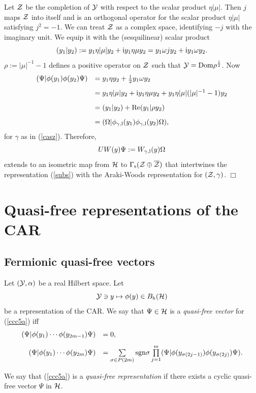 \documentclass{svmult}
\newcommand{\beq}{\begin{equation}}
\newcommand{\eeq}{\end{equation}}
\def\Re{{\rm Re}}
\def\bar{\overline}
\def\l{{\rm l}}
\def\s{{\rm s}}
\def\h{{\rm h}}
\def\cZ{{\cal Z}}
\def\cY{{\cal Y}}
\def\i{{\rm i}}
\def\Dom{{\rm Dom}}
\def\sgn{{\rm sgn}}
\def\qed{$\Box$\medskip}
\def\cH{{\cal H}}
\def\l{{\rm l}}
\def\sgn{{\rm sgn}}
\def\cH{{\cal H}}
\def\s{{\rm s}}
\begin{document}
Let $\cZ$ be the completion of $\cY$ with respect to the scalar product $\eta|\mu|$.
Then $j$ maps $\cZ$ into itself and is an orthogonal operator for
the scalar product $\eta|\mu|$ satisfying $j^2=-1$.
  We can treat  $\cZ$ as a complex space, identifying $-j$ with the
imaginary unit. We equip it with the (sesquilinear) scalar product
\[(y_1|y_2):=y_1\eta|\mu|y_2+\i y_1\eta\mu y_2
=y_1\omega jy_2+\i y_1\omega y_2.\] 
$\rho:=|\mu|^{-1}-1$ defines a positive operator on $\cZ$ such that
$\cY=\Dom\rho^{\frac12}$. 
Now
\[\begin{array}{rl}
(\Psi|\phi(y_1)\phi(y_2)\Psi)&=
y_1\eta y_2+\frac\i2 y_1\omega y_2\\[3mm]
&=
y_1\eta|\mu|y_2+\i y_1\eta\mu y_2
+y_1\eta|\mu|(|\mu|^{-1}-1)y_2
\\[3mm]
&=(y_1|y_2)+\Re(y_1|\rho y_2)\\[3mm]
&=(\Omega|\phi_{\gamma,\l}(y_1)\phi_{\gamma,\l}(y_2)\Omega),
\end{array}\]
for $\gamma$ as in (\ref{casz}).
Therefore,
\[UW(y)\Psi:=W_{\gamma,\l}(y)\Omega\]
extends to an isometric map from $\cH$ to $\Gamma_\s(\cZ\oplus\bar\cZ)$ that
intertwines 
 the representation (\ref{subs}) with the Araki-Woods representation for
 $(\cZ,\gamma)$. 
\qed




\section{Quasi-free representations of the CAR}



\subsection{Fermionic quasi-free vectors}

Let $(\cY,\alpha)$ be a real Hilbert space. Let
\beq \cY\ni y\mapsto \phi(y)\in B_\h(\cH)\label{ccc5a}\eeq
be  a representation of the CAR.
We say that $\Psi\in\cH$ is a {\em quasi-free vector }for (\ref{ccc5a}) iff 
\[\begin{array}{rl}
(\Psi|\phi(y_1)\cdots\phi(y_{2m-1})\Psi)&=0,\\[3mm]
(\Psi|\phi(y_1)\cdots\phi(y_{2m})\Psi)&=
\sum\limits_{\sigma\in P(2m)}\sgn\sigma
\prod\limits_{j=1}^m (\Psi|\phi(y_{\sigma(2j-1)})\phi(y_{\sigma(2j)})\Psi).
\end{array}\]




We say that (\ref{ccc5a}) is a
{\em quasi-free representation } if there exists a cyclic quasi-free vector $\Psi$
in $\cH$.
\end{document}
